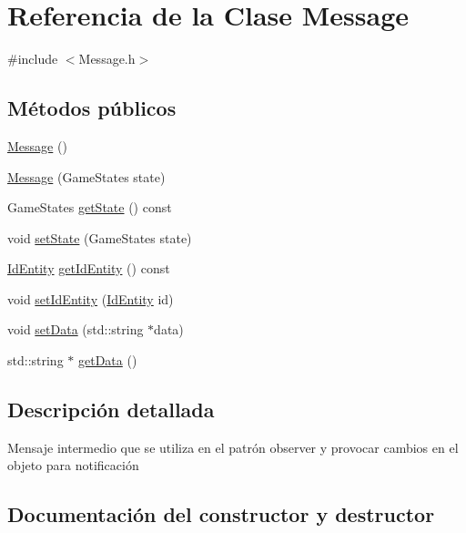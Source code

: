 \hypertarget{classMessage}{}\section{Referencia de la Clase Message}
\label{classMessage}


{\ttfamily \#include $<$Message.\+h$>$}

\subsection*{Métodos públicos}
\begin{DoxyCompactItemize}
\item 
\hyperlink{classMessage_a4fc4f717b634e66070366cb7722d7761}{Message} ()
\item 
\hyperlink{classMessage_aea145be2c9b61e83ea5fc5ecc076cf13}{Message} (Game\+States state)
\item 
Game\+States \hyperlink{classMessage_aa50d9a886ab478eff2455adc1fe55bde}{get\+State} () const 
\item 
void \hyperlink{classMessage_ac744e76db938f119be824b22d6dd8156}{set\+State} (Game\+States state)
\item 
\hyperlink{classIdEntity}{Id\+Entity} \hyperlink{classMessage_a18e8816b662ce9b4df16279743b17db0}{get\+Id\+Entity} () const 
\item 
void \hyperlink{classMessage_a77ef2e887c2bf958d970f0a240243b65}{set\+Id\+Entity} (\hyperlink{classIdEntity}{Id\+Entity} id)
\item 
void \hyperlink{classMessage_ac3df51b5a409d4962768e6d0d8595f2f}{set\+Data} (std\+::string $\ast$data)
\item 
std\+::string $\ast$ \hyperlink{classMessage_a18d2d59a27010dd396f2842dbf6ecfc2}{get\+Data} ()
\end{DoxyCompactItemize}


\subsection{Descripción detallada}
Mensaje intermedio que se utiliza en el patrón observer y provocar cambios en el objeto para notificación 

\subsection{Documentación del constructor y destructor}
\hypertarget{classMessage_a4fc4f717b634e66070366cb7722d7761}{}
